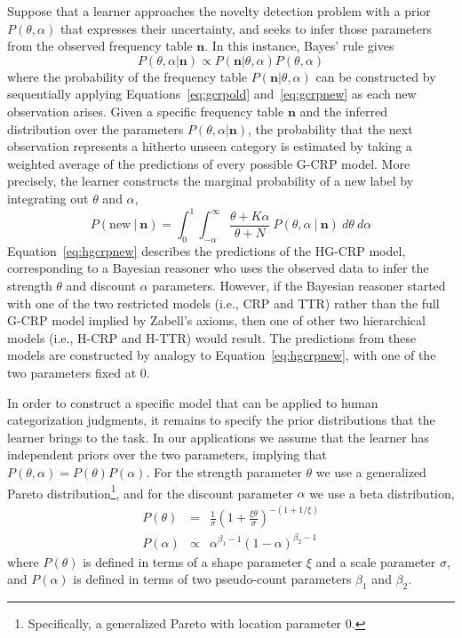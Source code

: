 \documentclass[doc]{apa6}
\newcommand{\given}{\ | \ }
\begin{document}
Suppose that a learner approaches the novelty detection problem with a prior $P(\theta,\alpha)$ that expresses their uncertainty, and seeks to infer those parameters from the observed frequency table $\bm{n}$. In this instance, Bayes' rule gives
\begin{equation}
\label{parameterlearning}
P(\theta,\alpha | \bm{n}) \propto P(\bm{n} | \theta,\alpha) P(\theta,\alpha)
\end{equation}
where the probability of the frequency table $P(\bm{n} | \theta,\alpha)$ can be constructed by sequentially applying Equations~\ref{eq:gcrpold} and~\ref{eq:gcrpnew} as each new observation arises. Given a specific frequency table $\bm{n}$ and the inferred distribution over the parameters $P(\theta,\alpha | \bm{n})$, the probability that the next observation represents a hitherto unseen category is estimated by taking a weighted average of the predictions of every possible G-CRP model. More precisely, the learner constructs the marginal probability of a new label by integrating out $\theta$ and $\alpha$,
\begin{equation}
\label{eq:hgcrpnew}
P(\mbox{new} \given \bm{n}) = \int_0^1 \!\! \int_{-\alpha}^\infty \ \frac{\theta + K\alpha}{\theta + N} \ P(\theta, \alpha \given \bm{n}) \ d\theta \ d\alpha
\end{equation}
Equation~\ref{eq:hgcrpnew} describes the predictions of the HG-CRP model, corresponding to a Bayesian reasoner who uses the observed data to infer the strength $\theta$ and discount $\alpha$ parameters. However, if the Bayesian reasoner started with one of the two restricted models (i.e., CRP and TTR) rather than the full G-CRP model implied by Zabell's axioms, then one of other two hierarchical models (i.e., H-CRP and H-TTR) would result. The predictions from these models are constructed by analogy to Equation~\ref{eq:hgcrpnew}, with one of the two parameters fixed at 0.

In order to construct a specific model that can be applied to human categorization judgments, it remains to specify the prior distributions that the learner brings to the task. In our applications we assume that the learner has independent priors over the two parameters, implying that $P(\theta,\alpha)=P(\theta)P(\alpha)$. For the strength parameter $\theta$ we use a generalized Pareto distribution\footnote{Specifically, a generalized Pareto with location parameter 0.}, and for the discount parameter $\alpha$ we use a beta distribution,
\begin{eqnarray}
P(\theta) &=& \frac{1}{\sigma}\left(1+\frac{\xi\theta}{\sigma}\right)^{-(1+1/\xi)}\\
P(\alpha) &\propto& \alpha^{\beta_1 - 1} (1-\alpha)^{\beta_2 -1}
\end{eqnarray}
where $P(\theta)$ is defined in terms of a shape parameter $\xi$ and a scale parameter $\sigma$, and $P(\alpha)$ is defined in terms of two pseudo-count parameters $\beta_1$ and $\beta_2$.
\end{document}
